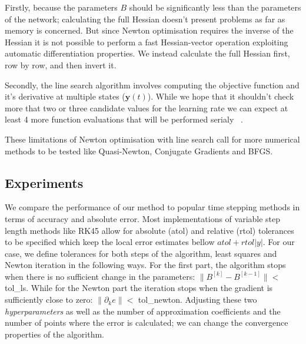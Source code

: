 \documentclass[11pt]{article}
\begin{document}
    Firstly, because the parameters $B$ should be significantly less than the parameters of the network; calculating the
    full Hessian doesn't present problems as far as memory is concerned.
    But since Newton optimisation requires the inverse of the Hessian it is not possible to perform a fast
    Hessian-vector operation exploiting automatic differentiation properties.
    We instead calculate the full Hessian first, row by row, and then invert it.

    Secondly, the line search algorithm involves computing the objective function and it's derivative at multiple
    states ($\pmb{y}(t)$).
    While we hope that it shouldn't check more that two or three candidate values for the learning rate we can
    expect at least 4 more function evaluations that will be performed serialy ~\cite{wright2006numerical}.

    These limitations of Newton optimisation with line search call for more numerical methods to be tested like
    Quasi-Newton, Conjugate Gradients and BFGS.


    \subsection{Experiments}
    We compare the performance of our method to popular time stepping methods in terms of accuracy and absolute error.
    Most implementations of variable step length methods like RK45 allow for absolute (atol) and relative (rtol)
    tolerances to be specified which keep the local error estimates bellow $atol + rtol |y|$.
    For our case, we define tolerances for both steps of the algorithm, least squares and Newton iteration in the
    following ways.
    For the first part, the algorithm stops when there is no sufficient change in the parameters:
    $\lVert B^{[k]} - B^{[k-1]} \rVert < $ tol\_ls.
    While for the Newton part the iteration stops when the gradient is sufficiently close to zero:
    $ \lVert \partial_k e \rVert < $ tol\_newton.
    Adjusting these two \textit{hyperparameters} as well as the number of approximation coefficients and the number of
    points where the error is calculated; we can change the convergence properties of the algorithm.
\end{document}
